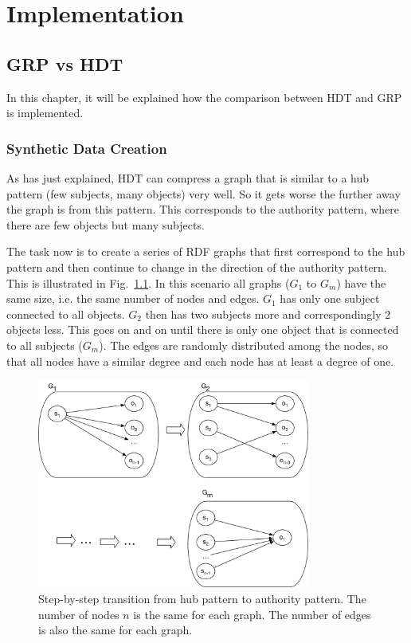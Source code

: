 \chapter{Implementation}\label{ch:implementation}


\section{GRP vs HDT}\label{sec:implementationGRPvsHDT}

In this chapter, it will be explained how the comparison between HDT and GRP is implemented.

\subsection{Synthetic Data Creation}\label{sec:data_creation}

As has just explained, HDT can compress a graph that is similar to a hub pattern (few subjects, many objects) very well. So it gets worse the further away the graph is from this pattern. This corresponds to the authority pattern, where there are few objects but many subjects.

The task now is to create a series of RDF graphs that first correspond to the hub pattern and then continue to change in the direction of the authority pattern. This is illustrated in Fig.~\ref{fig:star_pattern}. In this scenario all graphs ($G_1$ to $G_m$) have the same size, i.e. the same number of nodes and edges. $G_1$ has only one subject connected to all objects. $G_2$ then has two subjects more and correspondingly 2 objects less. This goes on and on until there is only one object that is connected to all subjects ($G_m$). The edges are randomly distributed among the nodes, so that all nodes have a similar degree and each node has at least a degree of one.

\begin{figure}[h]
	\centering
	\includegraphics[width=0.8\textwidth]{figures/GRPvsHDT/starpattern.pdf}
	\caption{Step-by-step transition from hub pattern to authority pattern. The number of nodes $n$ is the same for each graph. The number of edges is also the same for each graph.}
	\label{fig:star_pattern}
\end{figure}

